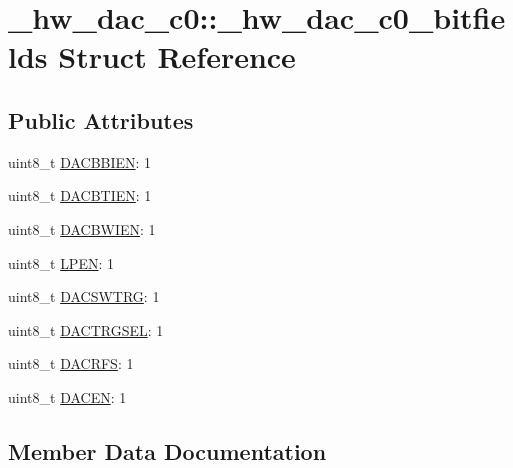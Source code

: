 \hypertarget{struct__hw__dac__c0_1_1__hw__dac__c0__bitfields}{}\section{\+\_\+hw\+\_\+dac\+\_\+c0\+:\+:\+\_\+hw\+\_\+dac\+\_\+c0\+\_\+bitfields Struct Reference}
\label{struct__hw__dac__c0_1_1__hw__dac__c0__bitfields}
\subsection*{Public Attributes}
\begin{DoxyCompactItemize}
\item 
uint8\+\_\+t \hyperlink{struct__hw__dac__c0_1_1__hw__dac__c0__bitfields_aebcc88412a6d8cc3fd0561b9d694e0e5}{D\+A\+C\+B\+B\+I\+EN}\+: 1
\item 
uint8\+\_\+t \hyperlink{struct__hw__dac__c0_1_1__hw__dac__c0__bitfields_abb6dd0ca2cf76fccec88532878f53fc0}{D\+A\+C\+B\+T\+I\+EN}\+: 1
\item 
uint8\+\_\+t \hyperlink{struct__hw__dac__c0_1_1__hw__dac__c0__bitfields_ae1da3aa3a305858c17c263615657bb2d}{D\+A\+C\+B\+W\+I\+EN}\+: 1
\item 
uint8\+\_\+t \hyperlink{struct__hw__dac__c0_1_1__hw__dac__c0__bitfields_ab9711ff5a04e09b7e30ab276f2c0de20}{L\+P\+EN}\+: 1
\item 
uint8\+\_\+t \hyperlink{struct__hw__dac__c0_1_1__hw__dac__c0__bitfields_a00f7f2a63f2038a2cf1f9fb1ebcce932}{D\+A\+C\+S\+W\+T\+RG}\+: 1
\item 
uint8\+\_\+t \hyperlink{struct__hw__dac__c0_1_1__hw__dac__c0__bitfields_a373f677b675a01324f4220bf0fb46090}{D\+A\+C\+T\+R\+G\+S\+EL}\+: 1
\item 
uint8\+\_\+t \hyperlink{struct__hw__dac__c0_1_1__hw__dac__c0__bitfields_a064fb8f8f951e0f6a0b1c232dce6f397}{D\+A\+C\+R\+FS}\+: 1
\item 
uint8\+\_\+t \hyperlink{struct__hw__dac__c0_1_1__hw__dac__c0__bitfields_a987d0a65ce0eb5b4401146fd7af2c484}{D\+A\+C\+EN}\+: 1
\end{DoxyCompactItemize}


\subsection{Member Data Documentation}
